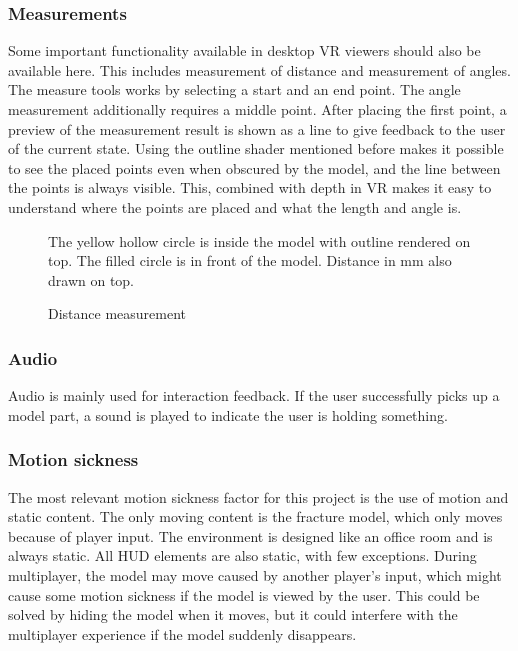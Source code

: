 \documentclass[a4paper]{report}
\begin{document}
\subsubsection{Measurements}
Some important functionality available in desktop VR viewers should also be available here. This includes measurement of distance and measurement of angles.
The measure tools works by selecting a start and an end point. The angle measurement additionally requires a middle point.
After placing the first point, a preview of the measurement result is shown as a line to give feedback to the user of the current state.
Using the outline shader mentioned before makes it possible to see the placed points even when obscured by the model, and the line between the points is always visible. This, combined with depth in VR makes it easy to understand where the points are placed and what the length and angle is.

\begin{figure}[h!]
    \centering
	\hfill
  \caption{Distance measurement}
  \small
  The yellow hollow circle is inside the model with outline rendered on top. The filled circle is in front of the model. Distance in mm also drawn on top.
~\cite{mishra_virtual_2019}
\end{figure}

\subsubsection{Audio}
Audio is mainly used for interaction feedback. If the user successfully picks up a model part, a sound is played to indicate the user is holding something.

\subsubsection{Motion sickness}
The most relevant motion sickness factor for this project is the use of motion and static content. The only moving content is the fracture model, which only moves because of player input. The environment is designed like an office room and is always static. All HUD elements are also static, with few exceptions.
During multiplayer, the model may move caused by another player's input, which might cause some motion sickness if the model is viewed by the user. This could be solved by hiding the model when it moves, but it could interfere with the multiplayer experience if the model suddenly disappears.
\end{document}
